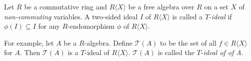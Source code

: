 \documentclass[12pt]{article}
\begin{document}
Let $R$ be a commutative ring and $R\langle X \rangle$ be a free algebra over $R$ on a set $X$ of \emph{non-commuting} variables.  A two-sided ideal $I$ of $R\langle X\rangle$ is called a $T$-\emph{ideal} if $\phi(I)\subseteq I$ for any $R$-endomorphism $\phi$ of $R\langle X\rangle$.

For example, let $A$ be a $R$-algebra.  Define $\mathcal{T}(A)$ to be the set of all  $f\in R\langle X\rangle$ for $A$.  Then $\mathcal{T}(A)$ is a $T$-ideal of $R\langle X\rangle$.  $\mathcal{T}(A)$ is called the $T$-\emph{ideal of  of A}.
\end{document}
